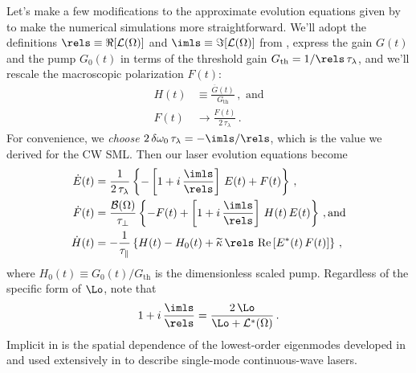  Let's make a few modifications to the approximate evolution equations given by  to make the numerical simulations more straightforward. We'll adopt the definitions $\rels \equiv \Re[\mathcal{L}(\Omega)]$ and $\imls \equiv \Im[\mathcal{L}(\Omega)]$ from , express the gain $G(t)$ and the pump $G_0(t)$ in terms of the threshold gain $G_\mathrm{th} = 1/\rels\, \tau_\lambda$, and we'll rescale the macroscopic polarization $F(t)$:
 \begin{align}
   H(t) &\equiv \frac{\overline{G}(t)}{G_\mathrm{th}}\, , \textrm{ and} \\
   F(t) &\longrightarrow \frac{F(t)}{2\, \tau_\lambda}\, .
 \end{align}
For convenience, we \emph{choose} $2\, \delta \omega_0\, \tau_\lambda = -\imls / \rels$, which is the value we derived for the CW SML. Then our laser evolution equations become
\begin{subequations} \label{eqn:la1d_sml_dynamics}
  \begin{align}
    \label{eqn:la1d_sml_dynamics_edot} \dot{E}(t) &= \frac{1}{2\, \tau_\lambda} \left\{ -\left[1 + i\, \frac{\imls}{\rels}\right]\, E(t) + F(t) \right\}\, , \\
    \label{eqn:la1d_sml_dynamics_fdot} \dot{F}(t) &= \frac{\mathcal{B}(\Omega)}{\tau_\perp} \left\{ -F(t) + \left[1 + i\, \frac{\imls}{\rels}\right]\, H(t)\, E(t) \right\}\, , \textrm{and} \\
    \label{eqn:la1d_sml_dynamics_hdot} \dot{H}(t) &= -\frac{1}{\tau_\parallel} \left\{ H(t) - H_0(t) + \widetilde{\kappa}\, \rels\, \operatorname{Re} \left[E^\ast(t)\, F(t) \right] \right\}\, ,
  \end{align}
\end{subequations}
where $H_0(t) \equiv G_0(t) / G_\mathrm{th}$ is the dimensionless scaled pump. Regardless of the specific form of $\Lo$, note that
\begin{equation}
  \label{eqn:ld1d_sml_pulling}
  1 + i\, \frac{\imls}{\rels} = \frac{2\, \Lo}{\Lo + \mathcal{L}^\ast(\Omega)} \, . 
\end{equation}
Implicit in  is the spatial dependence of the lowest-order eigenmodes developed in  and used extensively in  to describe single-mode continuous-wave lasers.

